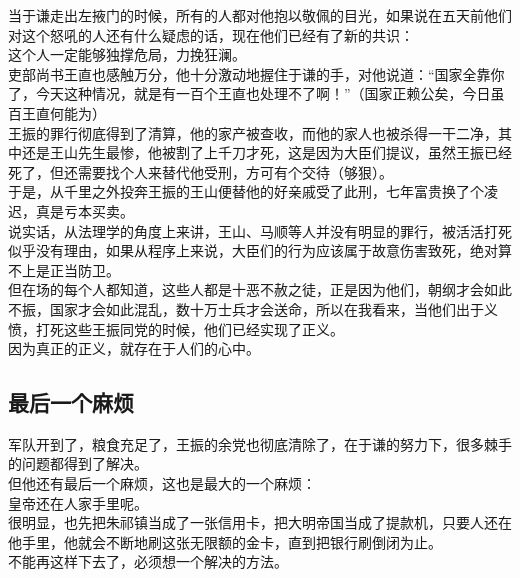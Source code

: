 \begin{multicols}{\theparacolNo}
当于谦走出左掖门的时候，所有的人都对他抱以敬佩的目光，如果说在五天前他们对这个怒吼的人还有什么疑虑的话，现在他们已经有了新的共识：\\

这个人一定能够独撑危局，力挽狂澜。\\

吏部尚书王直也感触万分，他十分激动地握住于谦的手，对他说道：“国家全靠你了，今天这种情况，就是有一百个王直也处理不了啊！”（国家正赖公矣，今日虽百王直何能为）\\

王振的罪行彻底得到了清算，他的家产被查收，而他的家人也被杀得一干二净，其中还是王山先生最惨，他被割了上千刀才死，这是因为大臣们提议，虽然王振已经死了，但还需要找个人来替代他受刑，方可有个交待（够狠）。\\

于是，从千里之外投奔王振的王山便替他的好亲戚受了此刑，七年富贵换了个凌迟，真是亏本买卖。\\

说实话，从法理学的角度上来讲，王山、马顺等人并没有明显的罪行，被活活打死似乎没有理由，如果从程序上来说，大臣们的行为应该属于故意伤害致死，绝对算不上是正当防卫。\\

但在场的每个人都知道，这些人都是十恶不赦之徒，正是因为他们，朝纲才会如此不振，国家才会如此混乱，数十万士兵才会送命，所以在我看来，当他们出于义愤，打死这些王振同党的时候，他们已经实现了正义。\\

因为真正的正义，就存在于人们的心中。\\

\subsection{最后一个麻烦}
军队开到了，粮食充足了，王振的余党也彻底清除了，在于谦的努力下，很多棘手的问题都得到了解决。\\

但他还有最后一个麻烦，这也是最大的一个麻烦：\\

皇帝还在人家手里呢。\\

很明显，也先把朱祁镇当成了一张信用卡，把大明帝国当成了提款机，只要人还在他手里，他就会不断地刷这张无限额的金卡，直到把银行刷倒闭为止。\\

不能再这样下去了，必须想一个解决的方法。\\


\end{multicols}

